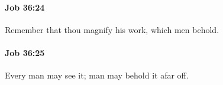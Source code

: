 		\paragraph{Job 36:24} %
			\label{JOB-36-24}

			Remember that thou magnify his work, which men behold.


		\paragraph{Job 36:25} %
			\label{JOB-36-25}

			Every man may see it; man may behold it afar off.



